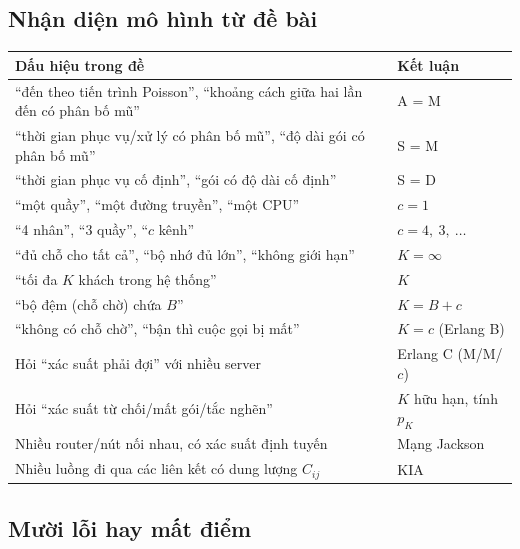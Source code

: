 \subsection{Nhận diện mô hình từ đề bài}\label{sec:nhandien}

\begin{center}
\begin{tabularx}{\linewidth}{@{}X l@{}}
\toprule
\textbf{Dấu hiệu trong đề} & \textbf{Kết luận} \\
\midrule
“đến theo tiến trình Poisson”, “khoảng cách giữa hai lần đến có phân bố mũ” & A = M \\
“thời gian phục vụ/xử lý có phân bố mũ”, “độ dài gói có phân bố mũ” & S = M \\
“thời gian phục vụ cố định”, “gói có độ dài cố định” & S = D \\
“một quầy”, “một đường truyền”, “một CPU” & $c=1$ \\
“4 nhân”, “3 quầy”, “$c$ kênh” & $c = 4,\ 3,\ \dots$ \\
“đủ chỗ cho tất cả”, “bộ nhớ đủ lớn”, “không giới hạn” & $K=\infty$ \\
“tối đa $K$ khách trong hệ thống” & $K$ \\
“bộ đệm (chỗ chờ) chứa $B$” & $K = B + c$ \\
“không có chỗ chờ”, “bận thì cuộc gọi bị mất” & $K = c$ (Erlang B) \\
Hỏi “xác suất phải đợi” với nhiều server & Erlang C (M/M/$c$) \\
Hỏi “xác suất từ chối/mất gói/tắc nghẽn” & $K$ hữu hạn, tính $p_K$ \\
Nhiều router/nút nối nhau, có xác suất định tuyến & Mạng Jackson \\
Nhiều luồng đi qua các liên kết có dung lượng $C_{ij}$ & KIA \\
\bottomrule
\end{tabularx}
\end{center}

\subsection{Mười lỗi hay mất điểm}

